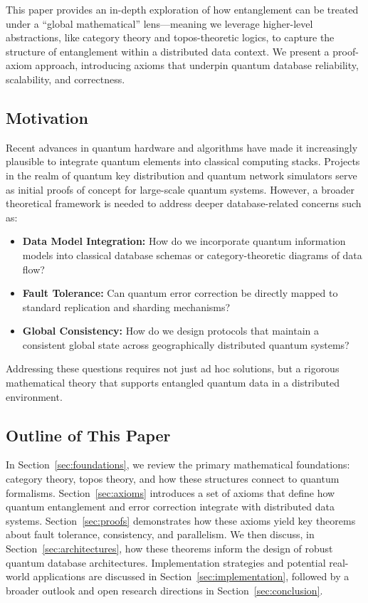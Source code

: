 \documentclass[12pt]{article}
\theoremstyle{definition}
\theoremstyle{remark}
\begin{document}
This paper provides an in-depth exploration of how entanglement can be treated under a ``global mathematical'' lens—meaning we leverage higher-level abstractions, like category theory and topos-theoretic logics, to capture the structure of entanglement within a distributed data context. We present a proof-axiom approach, introducing axioms that underpin quantum database reliability, scalability, and correctness.

\subsection{Motivation}
Recent advances in quantum hardware and algorithms have made it increasingly plausible to integrate quantum elements into classical computing stacks. Projects in the realm of quantum key distribution and quantum network simulators serve as initial proofs of concept for large-scale quantum systems. However, a broader theoretical framework is needed to address deeper database-related concerns such as:

\begin{itemize}
    \item \textbf{Data Model Integration:} How do we incorporate quantum information models into classical database schemas or category-theoretic diagrams of data flow?
    \item \textbf{Fault Tolerance:} Can quantum error correction be directly mapped to standard replication and sharding mechanisms?
    \item \textbf{Global Consistency:} How do we design protocols that maintain a consistent global state across geographically distributed quantum systems?
\end{itemize}

Addressing these questions requires not just ad hoc solutions, but a rigorous mathematical theory that supports entangled quantum data in a distributed environment.

\subsection{Outline of This Paper}
In Section~\ref{sec:foundations}, we review the primary mathematical foundations: category theory, topos theory, and how these structures connect to quantum formalisms. Section~\ref{sec:axioms} introduces a set of axioms that define how quantum entanglement and error correction integrate with distributed data systems. Section~\ref{sec:proofs} demonstrates how these axioms yield key theorems about fault tolerance, consistency, and parallelism. We then discuss, in Section~\ref{sec:architectures}, how these theorems inform the design of robust quantum database architectures. Implementation strategies and potential real-world applications are discussed in Section~\ref{sec:implementation}, followed by a broader outlook and open research directions in Section~\ref{sec:conclusion}.
\end{document}
